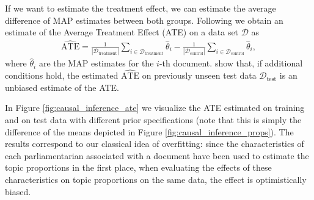 If we want to estimate the treatment effect, we can estimate the average difference of MAP estimates between both groups. Following \cite{egami2018make} we obtain an estimate of the Average Treatment Effect (ATE) on a data set $\mathcal{D}$ as 
\begin{align}
\widehat{\text{ATE}} = \frac{1}{|\mathcal{D}_{\text{treatment}}|}\sum_{i \in \mathcal{D}_{\text{treatment}}} \hat{\theta}_i - \frac{1}{|\mathcal{D}_{\text{control}}|}\sum_{i \in \mathcal{D}_{\text{control}}} \hat{\theta}_i,
\end{align} 
where $\hat{\theta}_i$ are the MAP estimates for the $i$-th document. \cite{egami2018make} show that, if additional conditions hold, the estimated $\widehat{\text{ATE}}$ on previously unseen test data $\mathcal{D}_{\text{test}}$ is an unbiased estimate of the ATE.

In Figure \ref{fig:causal_inference_ate} we visualize the ATE estimated on training and on test data with different prior specifications (note that this is simply the difference of the means depicted in Figure \ref{fig:causal_inference_props}). The results correspond to our classical idea of overfitting: since the characteristics of each parliamentarian associated with a document have been used to estimate the topic proportions in the first place, when evaluating the effects of these characteristics on topic proportions on the same data, the effect is optimistically biased.

